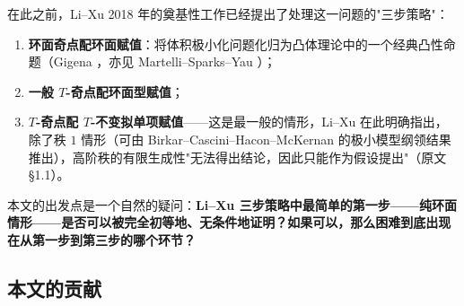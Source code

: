 \documentclass[11pt,a4paper]{article}
\theoremstyle{definition}
\theoremstyle{remark}
\begin{document}
在此之前，Li--Xu \cite{LX2018} 2018 年的奠基性工作已经提出了处理这一问题的"三步策略"：
\begin{enumerate}[leftmargin=1.6em]
  \item \textbf{环面奇点配环面赋值}：将体积极小化问题化归为凸体理论中的一个经典凸性命题（Gigena \cite{Gigena1978}，亦见 Martelli--Sparks--Yau \cite{MSY2008}）；
  \item \textbf{一般 $T$-奇点配环面型赋值}；
  \item \textbf{$T$-奇点配 $T$-不变拟单项赋值}——这是最一般的情形，Li--Xu 在此明确指出，除了秩 $1$ 情形（可由 Birkar--Cascini--Hacon--McKernan 的极小模型纲领结果 \cite{BCHM2010} 推出），高阶秩的有限生成性"无法得出结论，因此只能作为假设提出"（原文 \S1.1）。
\end{enumerate}

本文的出发点是一个自然的疑问：\textbf{Li--Xu 三步策略中最简单的第一步——纯环面情形——是否可以被完全初等地、无条件地证明？如果可以，那么困难到底出现在从第一步到第三步的哪个环节？}

\subsection{本文的贡献}
\end{document}
